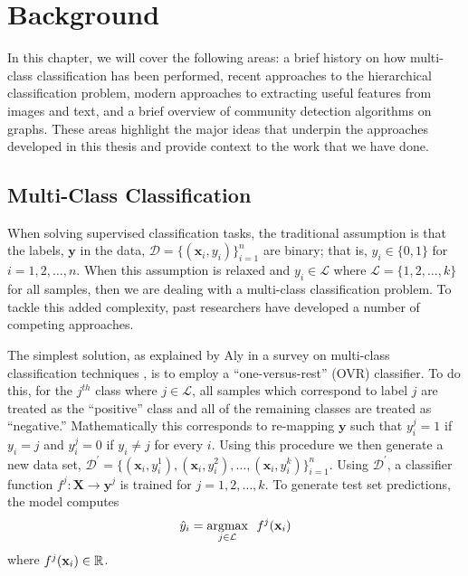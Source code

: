 \documentclass[../thesis.tex]{subfiles}
\begin{document}
\chapter{Background}

In this chapter, we will cover the following areas: a brief history on how multi-class classification has been performed, recent approaches to the hierarchical classification problem, modern approaches to extracting useful features from images and text, and a brief overview of community detection algorithms on graphs. These areas highlight the major ideas that underpin the approaches developed in this thesis and provide context to the work that we have done.

\section{Multi-Class Classification}
When solving supervised classification tasks, the traditional assumption is that the labels, $\mathbf{y}$ in the data, $\mathcal{D} = \{(\mathbf{x}_i, y_i)\}_{i=1}^n$ are binary; that is, $y_i \in \{0, 1\}$ for $i = 1, 2, \ldots, n$. When this assumption is relaxed and $y_i \in \mathcal{L}$ where $\mathcal{L} = \{1, 2, \ldots, k\}$ for all samples, then we are dealing with a multi-class classification problem. To tackle this added complexity, past researchers have developed a number of competing approaches.

The simplest solution, as explained by Aly in a survey on multi-class classification techniques \cite{aly2005survey}, is to employ a ``one-versus-rest'' (OVR) classifier. To do this, for the $j^{th}$ class where $j \in \mathcal{L}$, all samples which correspond to label $j$ are treated as the ``positive'' class and all of the remaining classes are treated as ``negative.'' Mathematically this corresponds to re-mapping $\mathbf{y}$ such that $y_i^j = 1$ if $y_i = j$ and $y_i^j = 0$ if $y_i \neq j$ for every $i$. Using this procedure we then generate a new data set, $\mathcal{D}^\prime = \{(\mathbf{x}_i, y_i^1), (\mathbf{x}_i, y_i^2), \ldots, (\mathbf{x}_i, y_i^k)\}_{i=1}^n$. Using $\mathcal{D}^\prime$, a classifier function $f^j: \mathbf{X} \rightarrow \mathbf{y}^j$ is trained for $j = 1, 2, \ldots, k.$ To generate test set predictions, the model computes
\begin{equation}
    \label{eq:ovr_pred}
    \hat{y}_i = \underset{j \in \mathcal{L}}{\argmax} \ \  f^j(\mathbf{x}_i)
\end{equation}
where $f^j(\mathbf{x}_i) \in \mathbb{R}$.
\end{document}
